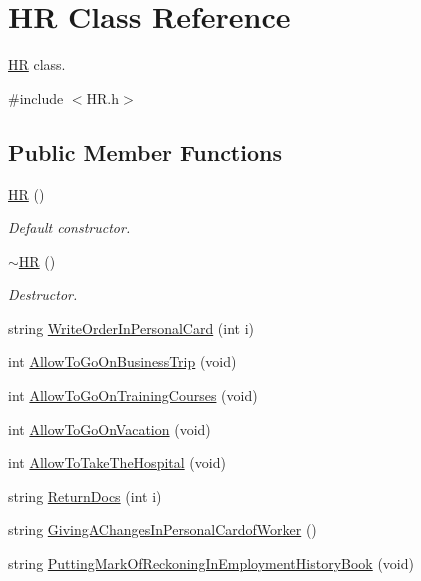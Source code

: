 \hypertarget{class_h_r}{}\section{HR Class Reference}
\label{class_h_r}


\hyperlink{class_h_r}{HR} class.  




{\ttfamily \#include $<$H\+R.\+h$>$}

\subsection*{Public Member Functions}
\begin{DoxyCompactItemize}
\item 
\hyperlink{class_h_r_a0cb187ef9d2c057d44e9bfcb679eed27}{HR} ()
\begin{DoxyCompactList}\small\item\em Default constructor. \end{DoxyCompactList}\item 
\hyperlink{class_h_r_a23fb380ea282a4193a7f05f81506c779}{$\sim$\+HR} ()
\begin{DoxyCompactList}\small\item\em Destructor. \end{DoxyCompactList}\item 
string \hyperlink{class_h_r_a3c509dc4449f8406ebd4bac482a8b50c}{Write\+Order\+In\+Personal\+Card} (int i)
\item 
int \hyperlink{class_h_r_af3a791db3d60be02234605865c0979da}{Allow\+To\+Go\+On\+Business\+Trip} (void)
\item 
int \hyperlink{class_h_r_a1a6f8313fedc1e0ad25827b35cb80427}{Allow\+To\+Go\+On\+Training\+Courses} (void)
\item 
int \hyperlink{class_h_r_a890c8452142fee7556b7498785f10b6f}{Allow\+To\+Go\+On\+Vacation} (void)
\item 
int \hyperlink{class_h_r_a7f7c6e9ee2f6010fbf53ceb94d18ddfb}{Allow\+To\+Take\+The\+Hospital} (void)
\item 
string \hyperlink{class_h_r_a0047e05a0a5ebee5dfafe50fe61ee373}{Return\+Docs} (int i)
\item 
string \hyperlink{class_h_r_ad794de5aee2a01b9ac3d5f22d435afba}{Giving\+A\+Changes\+In\+Personal\+Cardof\+Worker} ()
\item 
string \hyperlink{class_h_r_a3f962907d6ed8e81da66d4608ff3660d}{Putting\+Mark\+Of\+Reckoning\+In\+Employment\+History\+Book} (void)
\item 

\end{DoxyCompactItemize}
